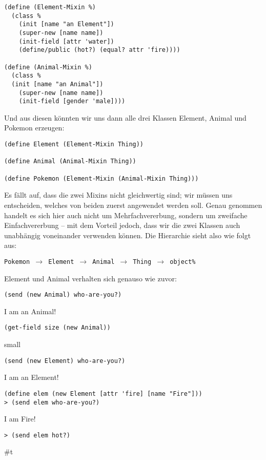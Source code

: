 \begin{lstlisting}
(define (Element-Mixin %)
  (class % 
    (init [name "an Element"])
    (super-new [name name])
    (init-field [attr 'water])
    (define/public (hot?) (equal? attr 'fire))))

(define (Animal-Mixin %)
  (class %
  (init [name "an Animal"])
    (super-new [name name])
    (init-field [gender 'male])))
\end{lstlisting}

Und aus diesen könnten wir uns dann alle drei Klassen Element, Animal und Pokemon erzeugen:
\begin{lstlisting}
(define Element (Element-Mixin Thing))

(define Animal (Animal-Mixin Thing))
 
(define Pokemon (Element-Mixin (Animal-Mixin Thing)))
\end{lstlisting}

Es fällt auf, dass die zwei Mixins nicht gleichwertig sind; wir müssen uns entscheiden, welches von beiden zuerst angewendet werden soll. Genau genommen handelt es sich hier auch nicht um Mehrfachvererbung, sondern um zweifache Einfachvererbung -- mit dem Vorteil jedoch, dass wir die zwei Klassen auch unabhängig voneinander verwenden können. Die Hierarchie sieht also wie folgt aus:

\texttt{Pokemon $\rightarrow$ Element $\rightarrow$ Animal $\rightarrow$ Thing $\rightarrow$ object\%}

Element und Animal verhalten sich genauso wie zuvor:

\begin{lstlisting}
(send (new Animal) who-are-you?)
\end{lstlisting}
{\routput {\qq}I am an Animal!\qq}

\begin{lstlisting}
(get-field size (new Animal))
\end{lstlisting}
{\rsymbol small}

\begin{lstlisting}
(send (new Element) who-are-you?)
\end{lstlisting}
{\routput {\qq}I am an Element!\qq}

\begin{lstlisting}
(define elem (new Element [attr 'fire] [name "Fire"]))
> (send elem who-are-you?)
\end{lstlisting} 
{\routput {\qq}I am Fire!\qq}

\begin{lstlisting}
> (send elem hot?)
\end{lstlisting} 
{\routput \#t}

